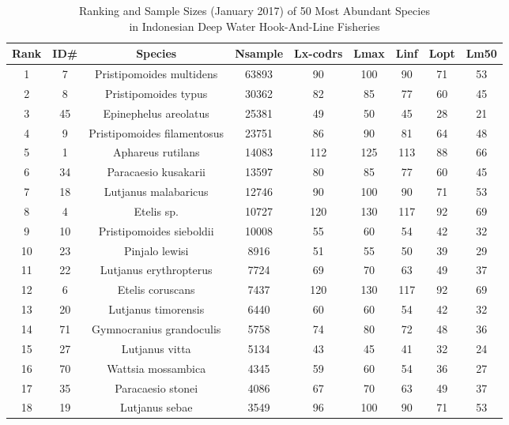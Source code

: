 %
%
\setlength{\tabcolsep}{5pt}
\captionsetup{width=1\textwidth, justification=centering}
\setlength{\LTpost}{0pt}
{\small
\begin{longtable}{ccccccccc}
\caption{Ranking and Sample Sizes (January 2017) of 50 Most Abundant Species \\in Indonesian Deep Water Hook-And-Line Fisheries} \\ 
  \hline
Rank & ID\# & Species & Nsample & Lx-codrs & Lmax & Linf & Lopt & Lm50 \\ 
  \hline
1 & 7 & Pristipomoides multidens & 63893 & 90 & 100 & 90 & 71 & 53 \\ 
  2 & 8 & Pristipomoides typus & 30362 & 82 & 85 & 77 & 60 & 45 \\ 
  3 & 45 & Epinephelus areolatus & 25381 & 49 & 50 & 45 & 28 & 21 \\ 
  4 & 9 & Pristipomoides filamentosus & 23751 & 86 & 90 & 81 & 64 & 48 \\ 
  5 & 1 & Aphareus rutilans & 14083 & 112 & 125 & 113 & 88 & 66 \\ 
  6 & 34 & Paracaesio kusakarii & 13597 & 80 & 85 & 77 & 60 & 45 \\ 
  7 & 18 & Lutjanus malabaricus & 12746 & 90 & 100 & 90 & 71 & 53 \\ 
  8 & 4 & Etelis sp. & 10727 & 120 & 130 & 117 & 92 & 69 \\ 
  9 & 10 & Pristipomoides sieboldii & 10008 & 55 & 60 & 54 & 42 & 32 \\ 
  10 & 23 & Pinjalo lewisi & 8916 & 51 & 55 & 50 & 39 & 29 \\ 
  11 & 22 & Lutjanus erythropterus & 7724 & 69 & 70 & 63 & 49 & 37 \\ 
  12 & 6 & Etelis coruscans & 7437 & 120 & 130 & 117 & 92 & 69 \\ 
  13 & 20 & Lutjanus timorensis & 6440 & 60 & 60 & 54 & 42 & 32 \\ 
  14 & 71 & Gymnocranius grandoculis & 5758 & 74 & 80 & 72 & 48 & 36 \\ 
  15 & 27 & Lutjanus vitta & 5134 & 43 & 45 & 41 & 32 & 24 \\ 
  16 & 70 & Wattsia mossambica & 4345 & 59 & 60 & 54 & 36 & 27 \\ 
  17 & 35 & Paracaesio stonei & 4086 & 67 & 70 & 63 & 49 & 37 \\ 
  18 & 19 & Lutjanus sebae & 3549 & 96 & 100 & 90 & 71 & 53 \\ 

\end{longtable}}
